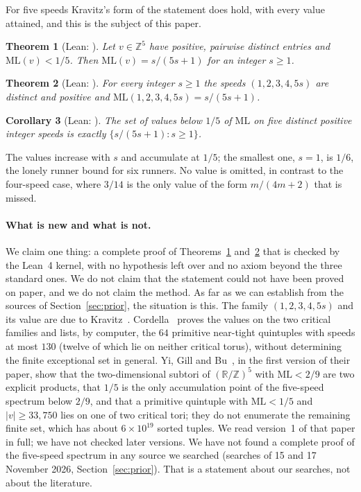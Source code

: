 \documentclass[11pt]{article}
\newtheorem{theorem}{Theorem}
\newtheorem{corollary}[theorem]{Corollary}
\theoremstyle{remark}
\newcommand{\ML}{\mathrm{ML}}
\newcommand{\R}{\mathbb{R}}
\newcommand{\Z}{\mathbb{Z}}
\begin{document}
For five speeds Kravitz's form of the statement does hold, with every value attained, and this is the subject of this paper.

\begin{theorem}[Lean: ]\label{thm:main}
Let $v\in\Z^5$ have positive, pairwise distinct entries and $\ML(v)<1/5$. Then $\ML(v)=s/(5s+1)$ for an integer $s\ge1$.
\end{theorem}
\begin{theorem}[Lean: ]\label{thm:attained}
For every integer $s\ge1$ the speeds $(1,2,3,4,5s)$ are distinct and positive and $\ML(1,2,3,4,5s)=s/(5s+1)$.
\end{theorem}
\begin{corollary}[Lean: ]\label{cor:iff}
The set of values below $1/5$ of $\ML$ on five distinct positive integer speeds is exactly $\{s/(5s+1):s\ge1\}$.
\end{corollary}
The values increase with $s$ and accumulate at $1/5$; the smallest one, $s=1$, is $1/6$, the lonely runner bound for six runners. No value is omitted, in contrast to the four-speed case, where $3/14$ is the only value of the form $m/(4m+2)$ that is missed.

\paragraph{What is new and what is not.} We claim one thing: a complete proof of Theorems~\ref{thm:main} and~\ref{thm:attained} that is checked by the Lean~4 kernel, with no hypothesis left over and no axiom beyond the three standard ones. We do not claim that the statement could not have been proved on paper, and we do not claim the method. As far as we can establish from the sources of Section~\ref{sec:prior}, the situation is this. The family $(1,2,3,4,5s)$ and its value are due to Kravitz~\cite{Kravitz21}. Cordella~\cite{Cordella} proves the values on the two critical families and lists, by computer, the $64$ primitive near-tight quintuples with speeds at most $130$ (twelve of which lie on neither critical torus), without determining the finite exceptional set in general. Yi, Gill and Bu~\cite{YGB}, in the first version of their paper, show that the two-dimensional subtori of $(\R/\Z)^5$ with $\ML<2/9$ are two explicit products, that $1/5$ is the only accumulation point of the five-speed spectrum below $2/9$, and that a primitive quintuple with $\ML<1/5$ and $|v|\ge33{,}750$ lies on one of two critical tori; they do not enumerate the remaining finite set, which has about $6\times10^{19}$ sorted tuples. We read version~1 of that paper in full; we have not checked later versions. We have not found a complete proof of the five-speed spectrum in any source we searched (searches of 15 and 17 November 2026, Section~\ref{sec:prior}). That is a statement about our searches, not about the literature.
\end{document}
